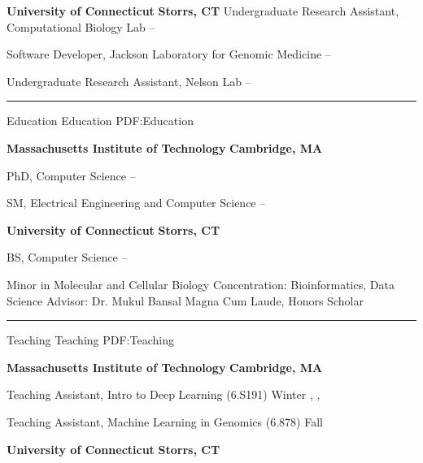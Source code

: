 \documentclass[letterpaper,MMMyyyy,nonstopmode]{simpleresumecv}
\begin{document}
\begin{Body}
\Entry
{\textbf{University of Connecticut}}
\hfill \textbf{Storrs, CT}
\Gap
\Item Undergraduate Research Assistant, Computational Biology Lab
\hfill
{} --

\Gap
\Item Software Developer, Jackson Laboratory for Genomic Medicine
\hfill
{} --

\Gap
\Item Undergraduate Research Assistant, Nelson Lab
\hfill
{} --

\BigGap
\hrule
\Section
{Education}
{Education}
{PDF:Education}

\Entry
\textbf{Massachusetts Institute of Technology}
\hfill \textbf{Cambridge, MA}

\Gap
\Item PhD, Computer Science
\hfill
{} --
\Gap
\begin{Detail}
\end{Detail}
\Gap

\Item SM, Electrical Engineering and Computer Science
\hfill
{} --
\BigGap

\Entry
\textbf{University of Connecticut}
\hfill \textbf{Storrs, CT}

\Gap
\Item BS, Computer Science
\hfill
{} --
\Gap
\begin{Detail}
\SubBulletItem Minor in Molecular and Cellular Biology
\SubBulletItem Concentration: Bioinformatics, Data Science
\SubBulletItem Advisor: Dr. Mukul Bansal
\SubBulletItem Magna Cum Laude, Honors Scholar
\end{Detail}


\BigGap
\hrule
\Section
{Teaching}
{Teaching}
{PDF:Teaching}

\Entry
{\textbf{Massachusetts Institute of Technology}}
\hfill \textbf{Cambridge, MA}

\Gap
\Item Teaching Assistant, Intro to Deep Learning (6.S191)
\hfill
Winter , , 

\Gap
\Item Teaching Assistant, Machine Learning in Genomics (6.878)
\hfill
Fall 

\BigGap
\Entry
{\textbf{University of Connecticut}}
\hfill \textbf{Storrs, CT}


\end{Body}
\end{document}
